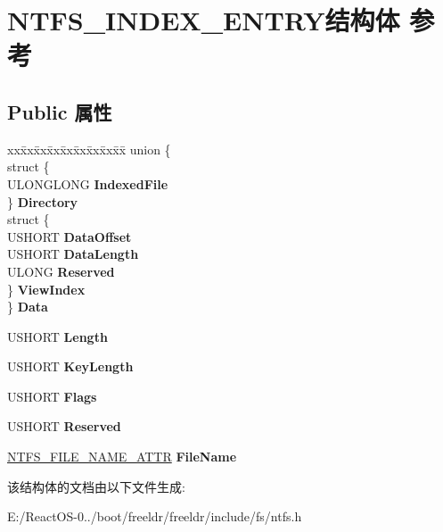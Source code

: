 \hypertarget{struct_n_t_f_s___i_n_d_e_x___e_n_t_r_y}{}\section{N\+T\+F\+S\+\_\+\+I\+N\+D\+E\+X\+\_\+\+E\+N\+T\+R\+Y结构体 参考}
\label{struct_n_t_f_s___i_n_d_e_x___e_n_t_r_y}
\subsection*{Public 属性}
\begin{DoxyCompactItemize}
\item 
\mbox{\label{struct_n_t_f_s___i_n_d_e_x___e_n_t_r_y_a7906d0d4682059d1cc02e35a4bf6adb4}} 
\begin{tabbing}
xx\=xx\=xx\=xx\=xx\=xx\=xx\=xx\=xx\=\kill
union \{\\
\>struct \{\\
\>\>ULONGLONG {\bfseries IndexedFile}\\
\>\} {\bfseries Directory}\\
\>struct \{\\
\>\>USHORT {\bfseries DataOffset}\\
\>\>USHORT {\bfseries DataLength}\\
\>\>ULONG {\bfseries Reserved}\\
\>\} {\bfseries ViewIndex}\\
\} {\bfseries Data}\\

\end{tabbing}\item 
\mbox{\label{struct_n_t_f_s___i_n_d_e_x___e_n_t_r_y_a64b86bab0d4d206762773c24bdf3d1d3}} 
U\+S\+H\+O\+RT {\bfseries Length}
\item 
\mbox{\label{struct_n_t_f_s___i_n_d_e_x___e_n_t_r_y_a451b8b0fe44c492e6721117bd333e723}} 
U\+S\+H\+O\+RT {\bfseries Key\+Length}
\item 
\mbox{\label{struct_n_t_f_s___i_n_d_e_x___e_n_t_r_y_a40fc0c4119d89138dbb2fd6c7c973ae7}} 
U\+S\+H\+O\+RT {\bfseries Flags}
\item 
\mbox{\label{struct_n_t_f_s___i_n_d_e_x___e_n_t_r_y_a2acc2fac5237ad556d4350673de57ae3}} 
U\+S\+H\+O\+RT {\bfseries Reserved}
\item 
\mbox{\label{struct_n_t_f_s___i_n_d_e_x___e_n_t_r_y_a0fe0a45bc502ec8f5b4032bd40fb46e3}} 
\hyperlink{struct_n_t_f_s___f_i_l_e___n_a_m_e___a_t_t_r}{N\+T\+F\+S\+\_\+\+F\+I\+L\+E\+\_\+\+N\+A\+M\+E\+\_\+\+A\+T\+TR} {\bfseries File\+Name}
\end{DoxyCompactItemize}


该结构体的文档由以下文件生成\+:\begin{DoxyCompactItemize}
\item 
E\+:/\+React\+O\+S-\/0../boot/freeldr/freeldr/include/fs/ntfs.\+h\end{DoxyCompactItemize}
